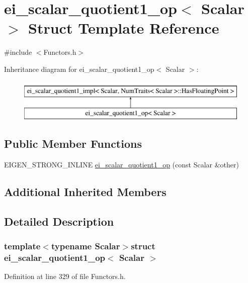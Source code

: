 \hypertarget{structei__scalar__quotient1__op}{\section{ei\-\_\-scalar\-\_\-quotient1\-\_\-op$<$ Scalar $>$ Struct Template Reference}
\label{structei__scalar__quotient1__op}
}


{\ttfamily \#include $<$Functors.\-h$>$}

Inheritance diagram for ei\-\_\-scalar\-\_\-quotient1\-\_\-op$<$ Scalar $>$\-:\begin{figure}[H]
\begin{center}
\leavevmode
\includegraphics[height=2.000000cm]{structei__scalar__quotient1__op}
\end{center}
\end{figure}
\subsection*{Public Member Functions}
\begin{DoxyCompactItemize}
\item 
E\-I\-G\-E\-N\-\_\-\-S\-T\-R\-O\-N\-G\-\_\-\-I\-N\-L\-I\-N\-E \hyperlink{structei__scalar__quotient1__op_a8dd2e3672672334e88dd67f6ee674bb9}{ei\-\_\-scalar\-\_\-quotient1\-\_\-op} (const Scalar \&other)
\end{DoxyCompactItemize}
\subsection*{Additional Inherited Members}


\subsection{Detailed Description}
\subsubsection*{template$<$typename Scalar$>$struct ei\-\_\-scalar\-\_\-quotient1\-\_\-op$<$ Scalar $>$}



Definition at line 329 of file Functors.\-h.




